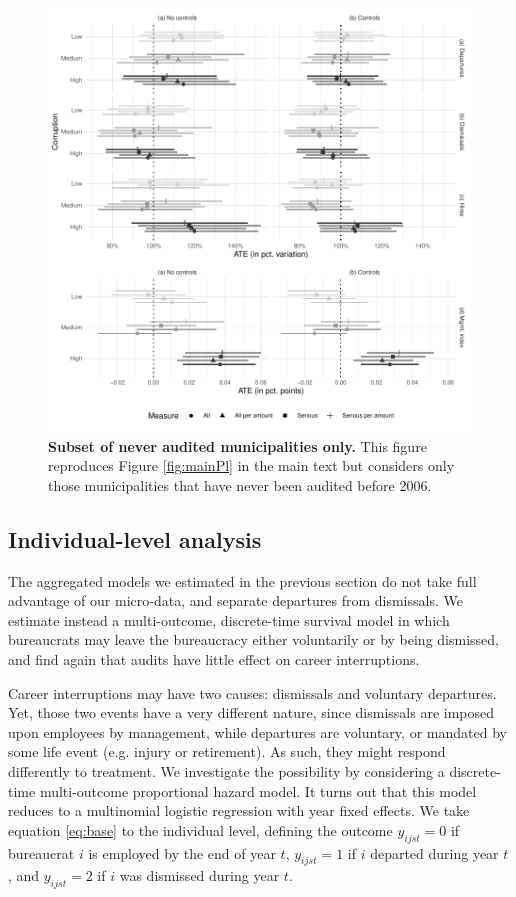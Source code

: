 {\begin{figure}[H]
    \centering
    \includegraphics{chapters/chapter_2/figures/plSubsetMun}
    \caption{{\bf Subset of never audited municipalities only.} This figure reproduces Figure \ref{fig:mainPl} in the main text but considers only those municipalities that have never been audited before 2006.}
    \label{fig:plSubsetMun}
\end{figure}


\subsection{Individual-level analysis}
\label{app:multinomial}

The aggregated models we estimated in the previous section do not take full advantage of our micro-data, and separate departures from dismissals. We estimate instead a multi-outcome, discrete-time survival model in which bureaucrats may leave the bureaucracy either voluntarily or by being dismissed, and find again that audits have little effect on career interruptions. 

Career interruptions may have two causes: dismissals and voluntary departures. Yet, those two events have a very different nature, since dismissals are imposed upon employees by management, while departures are voluntary, or mandated by some life event (e.g. injury or retirement). As such, they might respond differently to treatment. We investigate the possibility by considering a discrete-time multi-outcome proportional hazard model. It turns out that this model reduces to a multinomial logistic regression with year fixed effects. We take equation \ref{eq:base} to the individual level, defining the outcome $y_{ijst} = 0$ if bureaucrat $i$ is employed by the end of year $t$, $y_{ijst} = 1$ if $i$ departed during year $t$, and $y_{ijst} = 2$ if $i$ was dismissed during year $t$. 

}
